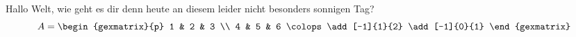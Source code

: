\documentclass{article}
\begin{document}
Hallo Welt, wie geht es dir denn heute an diesem leider nicht besonders sonnigen Tag?
\begin{equation*}
    A = \begin{gexmatrix}{p}
        1 & 2 & 3 \\ 
        4 & 5 & 6
        \colops
        \add[-1]{1}{2}
        \add[-1]{0}{1}
    \end{gexmatrix}
\end{equation*}
\end{document}
